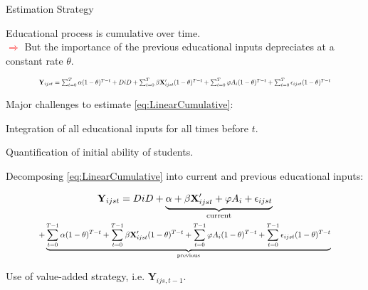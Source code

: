 \documentclass{beamer}
\begin{document}
\begin{frame}{Estimation Strategy}

\begin{itemize} 
{\footnotesize\item Educational process is cumulative over time. \\ \vspace{-7pt} \tiny\textcolor{red}{$\Longrightarrow$} But the importance of the previous educational inputs depreciates at a constant rate $\theta$.}
\vspace{-15pt}

\begin{equation} \label{eq:LinearCumulative}
\resizebox{.85\hsize}{!}{$\mathbf{Y}_{ijst} = \sum_{t=0}^T \alpha (1 - \theta)^{T-t} + DiD + \sum_{t=0}^T \beta \mathbf{X}_{ijst}^{\prime} (1 - \theta)^{T-t} + \sum_{t=0}^T \varphi A_{i} (1 - \theta)^{T-t} + \sum_{t=0}^T \epsilon_{ijst} (1 - \theta)^{T-t}$} 
\end{equation} 


\vspace{-1pt}
{\scriptsize Major challenges to estimate \eqref{eq:LinearCumulative}:}
\begin{itemize}
{\tiny\item Integration of all educational inputs for all times before $t$.}
\vspace{-5pt}
{\tiny\item Quantification of initial ability of students.} 
\end{itemize}


\vspace{8pt}
{\footnotesize\item Decomposing \eqref{eq:LinearCumulative} into current and previous educational inputs:}

\vspace{-20pt}
\begin{multline} \label{eq:LinearDecomp}
\mathbf{Y}_{ijst} = DiD + \underbrace{\alpha + \beta\mathbf{X}_{ijst}^{\prime} + \varphi A_{i} + \epsilon_{ijst}}_{\text{current}} \\
\resizebox{.85\hsize}{!}{$+ \underbrace{\sum_{t=0}^{T-1} \alpha (1 - \theta)^{T-t} + \sum_{t=0}^{T-1} \beta \mathbf{X}_{ijst}^{\prime} (1 - \theta)^{T-t} + \sum_{t=0}^{T-1} \varphi A_{i} (1 - \theta)^{T-t}  + \sum_{t=0}^{T-1} \epsilon_{ijst} (1 - \theta)^{T-t}}_{\text{previous}}$}
\end{multline}



{\footnotesize\item Use of value-added strategy, i.e. $\mathbf{Y}_{ijs,t-1}$.}
\end{itemize}
\end{frame}
\end{document}
